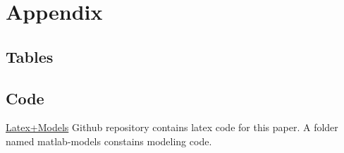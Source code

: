 \appendix

\section{Appendix}\label{sec:appendix}

\subsection{Tables}





























\subsection{Code}
\href{https://github.com/opj-johns/ci-thesis-dam-sltn-expn-mcdm}{Latex+Models}
Github repository contains latex code for this paper. A folder named matlab-models constains modeling code.



